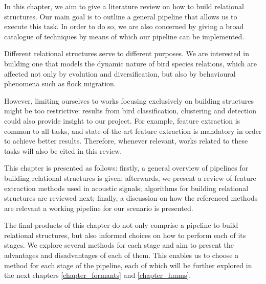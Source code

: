\documentclass[../main.tex]{subfiles} \label{chapter_soa}
\begin{document}
In this chapter, we aim to give a literature review on how to build relational structures. Our main goal is to outline a general pipeline that allows us to execute this task. In order to do so, we are also concerned by giving a broad catalogue of techniques by means of which our pipeline can be implemented.
\par Different relational structures serve to different purposes. We are interested in building one that models the dynamic nature of bird species relations, which are affected not only by evolution and diversification, but also by behavioural phenomena such as flock migration.
\par However, limiting ourselves to works focusing exclusively on building structures might be too restrictive: results from bird classification, clustering and detection could also provide insight to our project. For example, feature extraction is common to all tasks, and state-of-the-art feature extraction is mandatory in order to achieve better results. Therefore, whenever relevant, works related to these tasks will also be cited in this review.
\par This chapter is presented as follows: firstly, a general overview of pipelines for building relational structures is given; afterwards, we present a review of feature extraction methods used in acoustic signals; algorithms for building relational structures are reviewed next; finally, a discussion on how the referenced methods are relevant a working pipeline for our scenario is presented.
\par The final products of this chapter do not only comprise a pipeline to build relational structures, but also informed choices on how to perform each of its stages. We explore several methods for each stage and aim to present the advantages and disadvantages of each of them. This enables us to choose a method for each stage of the pipeline, each of which will be further explored in the next chapters \ref{chapter_formants} and \ref{chapter_hmms}. 
\end{document}
